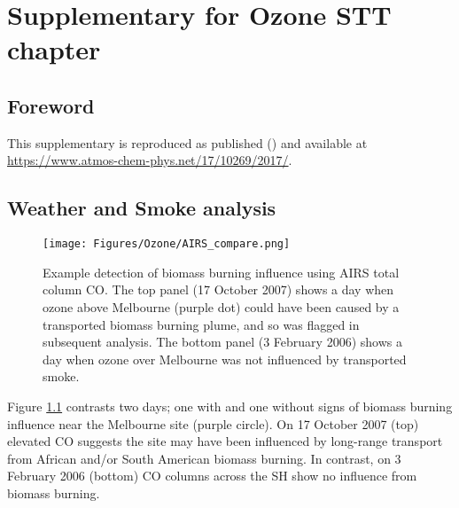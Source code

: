 
\setcounter{table}{0}
\renewcommand{\thetable}{S\arabic{table}}%
\setcounter{figure}{0}
\renewcommand{\thefigure}{S\arabic{figure}}%
\setcounter{section}{0}
\renewcommand{\thesection}{S\arabic{section}}

\chapter{Supplementary for Ozone STT chapter} %
\label{App:ozonesupplement}
  
  \section{Foreword}
    This supplementary is reproduced as published () and available at \url{https://www.atmos-chem-phys.net/17/10269/2017/}.
  
  \section{Weather and Smoke analysis}
  \label{App:ozonesupplement:WeatherSmoke}
  
  \begin{figure}[t]
    \texttt{[image: Figures/Ozone/AIRS\_compare.png]}
    \caption{ %
      Example detection of biomass burning influence using AIRS total column CO. 
      The top panel (17 October 2007) shows a day when ozone above Melbourne (purple dot) could have been caused by a transported biomass burning plume, and so was flagged in subsequent analysis.
      The bottom panel (3 February 2006) shows a day when ozone over Melbourne was not influenced by transported smoke.}
    \label{App:ozonesupplement:fig_excludedeg}
  \end{figure}
  
  Figure \ref{App:ozonesupplement:fig_excludedeg} contrasts two days; one with and one without signs of biomass burning influence near the Melbourne site (purple circle).
  On 17 October 2007 (top) elevated CO suggests the site may have been influenced by long-range transport from African and/or South American biomass burning.
  In contrast, on 3 February 2006 (bottom) CO columns across the SH show no influence from biomass burning.
  

